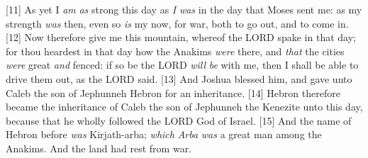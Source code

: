[11] \textcolor[cmyk]{0.99998,1,0,0}{As yet I \emph{am} \emph{as} strong this day as \emph{I} \emph{was} in the day that Moses sent me: as my strength \emph{was} then, even so \emph{is} my  now, for war, both to go out, and to come in.}
[12] \textcolor[cmyk]{0.99998,1,0,0}{Now therefore give me this mountain, whereof the LORD spake in that day; for thou heardest in that day how the Anakims \emph{were} there, and \emph{that} the cities \emph{were} great \emph{and} fenced: if so be the LORD \emph{will} \emph{be} with me, then I shall be able to drive them out, as the LORD said.}
[13] \textcolor[cmyk]{0.99998,1,0,0}{And Joshua blessed him, and gave unto Caleb the son of Jephunneh Hebron for an inheritance.}
[14] \textcolor[cmyk]{0.99998,1,0,0}{Hebron therefore became the inheritance of Caleb the son of Jephunneh the Kenezite unto this day, because that he wholly followed the LORD God of Israel.}
[15] \textcolor[cmyk]{0.99998,1,0,0}{And the name of Hebron before \emph{was} Kirjath-arba; \emph{which} \emph{Arba} \emph{was} a great man among the Anakims. And the land had rest from war.}
